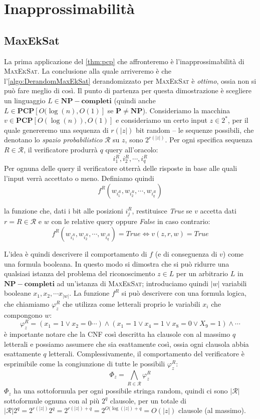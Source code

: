 \section{Inapprossimabilità}
\subsection{MaxEkSat}
La prima applicazione del \cref{thm:pcp} che affronteremo è l'inapprossimabilità di
\textsc{MaxEkSat}. La conclusione alla quale arriveremo è che l'\cref{algo:DerandomMaxEkSat} derandomizzato
per \textsc{MaxEkSat} è \textit{ottimo}, ossia non si può fare meglio di così.
Il punto di partenza per questa dimostrazione è scegliere un linguaggio
$L \in \mathbf{NP-completi}$ (quindi anche $L \in \mathbf{PCP}[O(\log(n), O(1)]$ se $\mathbf{P} \neq \mathbf{NP}$).
Consideriamo la macchina $v \in \mathbf{PCP}[O(\log(n)), O(1)]$ e consideriamo un
certo input $z \in 2^*$, per il quale genereremo una sequenza
di $r(|z|)$ bit random -- le sequenze possibili, che denotano lo \textit{spazio probabilistico}
$\mathcal{R}$ su $z$, sono $2^{r(|z|)}$.
Per ogni specifica sequenza $R \in \mathcal{R}$, il verificatore produrrà $q$ query all'oracolo:
$$
	i_{1}^R, i_{2}^R, \cdots, i_{q}^R
$$
Per ognuna delle query il verificatore otterrà delle risposte in base alle
quali l'input verrà accettato o meno. Definiamo quindi
$$
	f^R(w_{i_{1}^R}, w_{i_{2}^R}, \cdots, w_{i_{q}^R})
$$

la funzione che, dati i bit alle posizioni $i_{j}^R$, restituisce \textit{True} se $v$
accetta dati $r = R \in \mathcal{R}$ e $w$ con le relative query oppure \textit{False}
in caso contrario:
$$
	f^R(w_{i_{1}^R}, w_{i_{2}^R}, \cdots, w_{i_{q}^R}) = True \iff v(z, r, w) = True
$$

L'idea è quindi descrivere il comportamento di $f$ (e di conseguenza di $v$) come una
formula booleana. In questo modo si dimostra che si può ridurre una qualsiasi istanza
del problema del riconoscimento $z \in L$ per un arbitrario $L$ in $\mathbf{NP-completi}$
ad un'istanza di \textsc{MaxEkSat};
introduciamo quindi $|w|$ variabili booleane $x_1, x_2, \cdots x_{|w|}$.
La funzione $f^R$ si può descrivere con una formula logica, che chiamiamo
$\varphi^R_z$ che utilizza come letterali
proprio le variabili $x_i$ che compongono $w$:
$$
	\varphi^R_z = (x_1 = 1 \lor x_2 = 0 \cdots) \land (x_ 1 = 1 \lor x_4 = 1 \lor x_8 = 0 \lor X_9 = 1) \land \cdots
$$
è importante notare che la CNF così descritta ha clausole con al massimo
$q$ letterali e possiamo assumere che sia esattamente così, ossia ogni clausola
abbia esattamente $q$ letterali. Complessivamente, il comportamento del verificatore è
esprimibile come la congiunzione di tutte le possibili $\varphi^R_z$:
$$
	\Phi_z = \bigwedge_{R \in \mathcal{R}} \varphi_{z}^R
$$
$\Phi_z$ ha una sottoformula per ogni possibile stringa random, quindi ci sono
$|\mathcal{R}|$ sottoformule ognuna con al più $2^q$ clausole, per un totale di
$|\mathcal{R}|2^q = 2^{r(|z|)}2^q = 2^{r(|z|) + q} = 2^{O(\log(|z|) + q} = O(|z|)$ clausole (al massimo).

